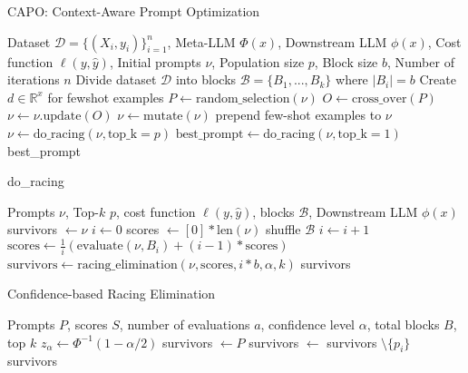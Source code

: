 \begin{algorithm}
    \caption{CAPO: Context-Aware Prompt Optimization}
    \begin{algorithmic}[1]
    \Require Dataset $\mathcal{D} = \{(X_i, y_i)\}_{i=1}^n$, Meta-LLM $\Phi(x)$, Downstream LLM $\phi(x)$, Cost function $\ell(y, \hat{y})$, Initial prompts $\nu$, Population size $p$, Block size $b$, Number of iterations $n$
    \State Divide dataset $\mathcal{D}$ into blocks $\mathcal{B} = \{B_1, ..., B_k\}$ where $|B_i| = b$
    \State Create $d \in \mathbb{R}^x$ for fewshot examples
        \State $P \gets \text{random\_selection}(\nu)$
        \State $O \gets \text{cross\_over}(P)$
        \State $\nu \gets \nu.\text{update}(O)$
        \State $\nu \gets \text{mutate}(\nu)$
        \State prepend few-shot examples to $\nu$
        \State $\nu \gets \text{do\_racing}(\nu, \text{top\_k}=p)$
    \EndFor
    \State $\text{best\_prompt} \gets \text{do\_racing}(\nu, \text{top\_k}=1)$
    \State \Return best\_prompt
    \end{algorithmic}
\end{algorithm}

\begin{algorithm}
    \caption{do\_racing}
    \begin{algorithmic}[1]
    \Require Prompts $\nu$, Top-$k$ $p$, cost function $\ell(y, \hat{y})$, blocks $\mathcal{B}$, Downstream LLM $\phi(x)$
    \State survivors $\gets \nu$
    \State $i \gets 0$
    \State scores $\gets [0]*\text{len}(\nu)$
    \State shuffle $\mathcal{B}$
        \State $i \gets i + 1$
        \State $\text{scores} \gets \frac{1}{i}\left(\text{evaluate}(\nu, B_i) + (i-1)*\text{scores}\right)$
        \State $\text{survivors} \gets \text{racing\_elimination}(\nu, \text{scores}, i*b, \alpha, k)$
    \EndWhile 
    \State \Return survivors
    \end{algorithmic}
\end{algorithm}

\begin{algorithm}
    \caption{Confidence-based Racing Elimination}
    \begin{algorithmic}[1]
    \Require Prompts $P$, scores $S$, number of evaluations $a$, confidence level $\alpha$, total blocks $B$, top $k$
    \State $z_{\alpha} \gets \Phi^{-1}(1-\alpha/2)$ 
    \State survivors $\gets P$
         
            \State survivors $\gets$ survivors $\setminus \{p_i\}$ 
        \EndIf
    \EndFor
    \State \Return survivors
    \end{algorithmic}
\end{algorithm}